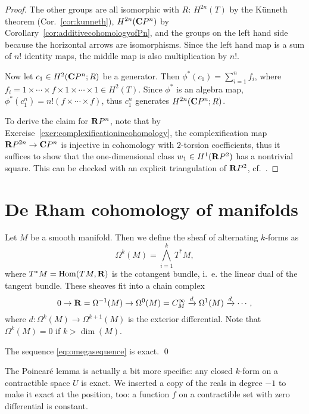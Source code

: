 \documentclass[a4paper,openany]{scrbook}
\begin{document}
\begin{proof}
The other groups are all isomorphic with $R$: $H^{2n}(T)$ by the Künneth theorem (Cor.~\ref{cor:kunneth}), $H^{2n}(\mathbf C P^n)$ by Corollary~\ref{cor:additivecohomologyofPn}, and the groups on the left hand side because the horizontal arrows are isomorphisms. Since the left hand map is a sum of $n!$ identity maps, the middle map is also multiplication by $n!$.

Now let $c_1 \in H^2(\mathbf C P^n;R)$ be a generator. Then $\phi^*(c_1) = \sum_{i=1}^n f_i$, where $f_i = 1 \times \cdots \times f \times 1 \times \cdots \times 1 \in H^2(T)$. Since $\phi^*$ is an algebra map, $\phi^*(c_1^n) = n!(f \times \cdots \times f)$, thus $c_1^n$ generates $H^{2n}(\mathbf C P^n;R)$.

To derive the claim for $\mathbf R P^n$, note that by Exercise~\ref{exer:complexificationincohomology}, the complexification map $\mathbf R P^{2n} \to \mathbf C P^n$ is injective in cohomology with $2$-torsion coefficients, thus it suffices to show that the one-dimensional class $w_1 \in H^1(\mathbf R P^2)$ has a nontrivial square. This can be checked with an explicit triangulation of $\mathbf R P^2$, cf.~\cite[Example VI.4.7]{bredon:topology-geometry}.
\end{proof}

\section{De Rham cohomology of manifolds}

Let $M$ be a smooth manifold. Then we define the sheaf of alternating $k$-forms as
\[
\Omega^k(M) = \bigwedge_{i=1}^k T^*M,
\]
where $T^*M = \operatorname{Hom}(TM,\mathbf R)$ is the cotangent bundle, i.~e. the linear dual of the tangent bundle. These sheaves fit into a chain complex
\begin{equation}\label{eq:omegasequence}
0 \to \mathbf R = \Omega^{-1}(M) \to \Omega^0(M) = C^\infty_M \xrightarrow{d} \Omega^1(M) \xrightarrow{d} \cdots,
\end{equation}
where $d\colon \Omega^k(M) \to \Omega^{k+1}(M)$ is the exterior differential. Note that $\Omega^k(M) = 0$ if $k > \dim(M)$.

\begin{lemma}
The sequence \eqref{eq:omegasequence} is exact. \qed
\end{lemma}

The Poincaré lemma is actually a bit more specific: any closed $k$-form on a contractible space $U$ is exact. We inserted a copy of the reals in degree $-1$ to make it exact at the position, too: a function $f$ on a contractible set with zero differential is constant.
\end{document}
